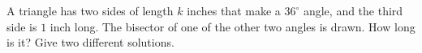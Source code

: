 A triangle has two sides of length $k$ inches that make a $36^\circ$ angle, and the third side is $1$ inch long. The bisector of one of the other two angles is drawn. How long is it? Give two different solutions.
